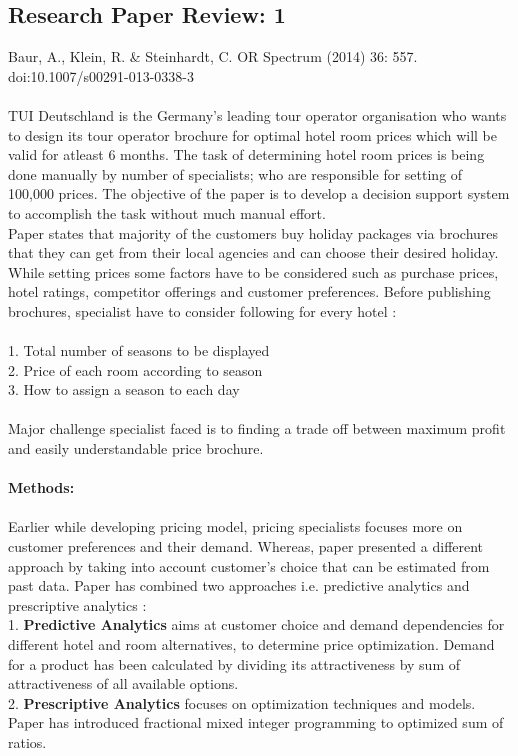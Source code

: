 \documentclass[paper=a4, fontsize=11pt]{scrartcl} %
\begin{document}
\subsection{Research Paper Review: 1}
Baur, A., Klein, R. \& Steinhardt, C. OR Spectrum (2014) 36: 557. doi:10.1007/s00291-013-0338-3 \\ \\
TUI Deutschland is the Germany's leading tour operator organisation who wants to design its tour operator brochure for optimal hotel room prices which will be valid for atleast 6 months. The task of determining hotel room prices is being done manually by number of specialists; who are responsible for setting of 100,000 prices. The objective of the paper is to develop a decision support system to accomplish the task without much manual effort.\\ 

Paper states that majority of the customers buy holiday packages via brochures that they can get from their local agencies and can choose their desired holiday. While setting prices some factors have to be considered such as purchase prices, hotel ratings, competitor offerings and customer preferences. Before publishing brochures, specialist have to consider following for every hotel : \\ \\
1. Total number of seasons to be displayed\\
2. Price of each room according to season\\
3. How to assign a season to each day \\ \\
Major challenge specialist faced is to finding a trade off between maximum profit and easily understandable price brochure. \\ \\
\textbf{Methods:}
\\ \\
Earlier while developing pricing model, pricing specialists focuses more on customer preferences and their demand. Whereas, paper presented a different approach by taking into account customer's choice that can be estimated from past data. Paper has combined two approaches i.e. predictive analytics and prescriptive analytics : \\
1. \textbf{Predictive Analytics} aims at customer choice and demand dependencies for different hotel and room alternatives, to determine price optimization. Demand for a product has been calculated by dividing its attractiveness by sum of attractiveness of all available options. \\
2. \textbf{Prescriptive Analytics} focuses on optimization techniques and models. Paper has introduced fractional mixed integer programming to optimized sum of ratios.  \\ 
\end{document}
